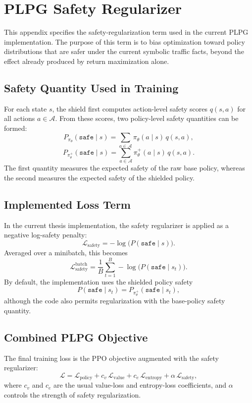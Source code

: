 \section{PLPG Safety Regularizer}
\label{app:safety-regularizer}

This appendix specifies the safety-regularization term used in the current PLPG implementation. The purpose of this term is to bias optimization toward policy distributions that are safer under the current symbolic traffic facts, beyond the effect already produced by return maximization alone.

\subsection{Safety Quantity Used in Training}

For each state \(s\), the shield first computes action-level safety scores \(q(s,a)\) for all actions \(a \in \mathcal{A}\). From these scores, two policy-level safety quantities can be formed:
\[
P_{\pi_\theta}(\texttt{safe}\mid s)
=
\sum_{a \in \mathcal{A}} \pi_\theta(a\mid s)\, q(s,a),
\]
\[
P_{\pi_\theta^+}(\texttt{safe}\mid s)
=
\sum_{a \in \mathcal{A}} \pi_\theta^+(a\mid s)\, q(s,a).
\]
\noindent The first quantity measures the expected safety of the raw base policy, whereas the second measures the expected safety of the shielded policy.

\subsection{Implemented Loss Term}

In the current thesis implementation, the safety regularizer is applied as a negative log-safety penalty:
\[
\mathcal{L}_{\mathrm{safety}}
=
-\log\!\big(P(\texttt{safe}\mid s)\big).
\]
\noindent Averaged over a minibatch, this becomes
\[
\mathcal{L}_{\mathrm{safety}}^{\mathrm{batch}}
=
\frac{1}{B}\sum_{t=1}^{B}
-\log\!\big(P(\texttt{safe}\mid s_t)\big).
\]
\noindent By default, the implementation uses the shielded policy safety
\[
P(\texttt{safe}\mid s_t)=P_{\pi_\theta^+}(\texttt{safe}\mid s_t),
\]
\noindent although the code also permits regularization with the base-policy safety quantity.

\subsection{Combined PLPG Objective}

The final training loss is the PPO objective augmented with the safety regularizer:
\[
\mathcal{L}
=
\mathcal{L}_{\mathrm{policy}}
+
c_v\,\mathcal{L}_{\mathrm{value}}
+
c_e\,\mathcal{L}_{\mathrm{entropy}}
+
\alpha\,\mathcal{L}_{\mathrm{safety}},
\]
\noindent where \(c_v\) and \(c_e\) are the usual value-loss and entropy-loss coefficients, and \(\alpha\) controls the strength of safety regularization.

